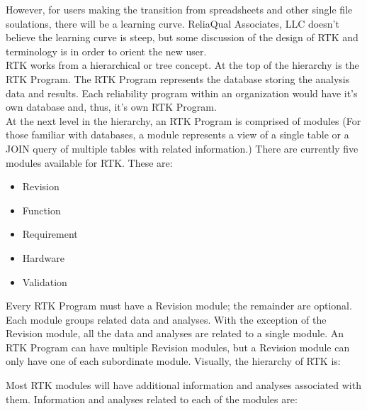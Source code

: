 \documentclass[twoside,12pt,letterpaper,openright]{book}
\begin{document}
\noindent However, for users making the transition from spreadsheets and other 
single file soulations, there will be a learning curve.  ReliaQual Associates, 
LLC doesn't believe the learning curve is steep, but some discussion of the 
design of RTK and terminology is in order to orient the new user.
\\

\noindent RTK works from a hierarchical or tree concept.  At the top of the 
hierarchy is the RTK Program.  The RTK Program represents the database storing 
the analysis data and results.  Each reliability program within an organization 
would have it's own database and, thus, it's own RTK Program. \\

\noindent At the next level in the hierarchy, an RTK Program is comprised of 
modules (For those familiar with databases, a module represents a view of a 
single table or a JOIN query of multiple tables with related information.)  
There are currently five modules available for RTK.  These are:
\\

\begin{itemize}
    \item Revision
    \item Function
    \item Requirement
    \item Hardware
    \item Validation
\end{itemize}

\noindent Every RTK Program must have a Revision module; the remainder are 
optional.
\\

\noindent Each module groups related data and analyses.  With the exception of 
the Revision module, all the data and analyses are related to a single module.  
An RTK Program can have multiple Revision modules, but a Revision module can 
only have one of each subordinate module.  Visually, the hierarchy of RTK is:
\\


\medskip
\noindent Most RTK modules will have additional information and analyses 
associated with them.  Information and analyses related to each of the modules
are:
\end{document}
